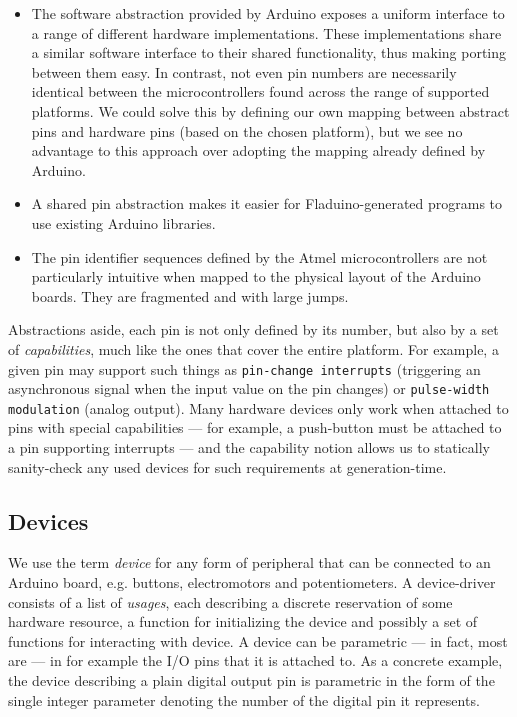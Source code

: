 \documentclass[a4paper, oneside, final]{memoir}
\begin{document}
\begin{itemize}
\item The software abstraction provided by Arduino exposes a uniform
  interface to a range of different hardware implementations.  These
  implementations share a similar software interface to their shared
  functionality, thus making porting between them easy.  In contrast,
  not even pin numbers are necessarily identical between the
  microcontrollers found across the range of supported platforms.  We
  could solve this by defining our own mapping between abstract pins
  and hardware pins (based on the chosen platform), but we see no
  advantage to this approach over adopting the mapping already defined
  by Arduino.
\item A shared pin abstraction makes it easier for Fladuino-generated
  programs to use existing Arduino libraries.
\item The pin identifier sequences defined by the Atmel
  microcontrollers are not particularly intuitive when mapped to the
  physical layout of the Arduino boards.  They are fragmented and with
  large jumps.
\end{itemize}

Abstractions aside, each pin is not only defined by its number, but
also by a set of \textit{capabilities}, much like the ones that cover
the entire platform.  For example, a given pin may support such things
as \texttt{pin-change interrupts} (triggering an asynchronous signal
when the input value on the pin changes) or \texttt{pulse-width
  modulation} (analog output).  Many hardware devices only work when
attached to pins with special capabilities --- for example, a
push-button must be attached to a pin supporting interrupts --- and
the capability notion allows us to statically sanity-check any used
devices for such requirements at generation-time.

\subsection{Devices}
\label{sec:devices}
We use the term \textit{device} for any form of peripheral that can be
connected to an Arduino board, e.g. buttons, electromotors and
potentiometers.  A device-driver consists of a list of
\textit{usages}, each describing a discrete reservation of some
hardware resource, a function for initializing the device and possibly
a set of functions for interacting with device.  A device can be
parametric --- in fact, most are --- in for example the I/O pins that
it is attached to.  As a concrete example, the device describing a
plain digital output pin is parametric in the form of the single
integer parameter denoting the number of the digital pin it
represents.
\end{document}
